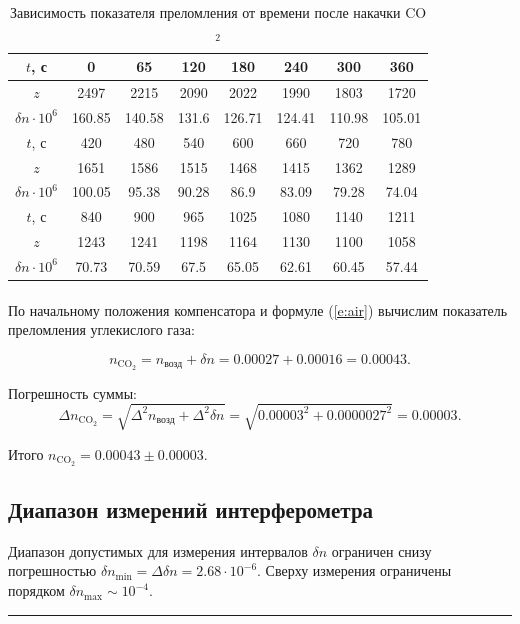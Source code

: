 \documentclass[a4paper,12pt]{article} %
\begin{document}
\begin{table}
\centering
\begin{tabular}{|c|c|c|c|c|c|c|c|}
\hline 
$t$, с & 0 & 65 & 120 & 180 & 240 & 300 & 360\\
\hline
$z$ & 2497 & 2215 & 2090 & 2022 & 1990 & 1803 & 1720\\
\hline
$\delta n \cdot 10^6$ & 160.85 & 140.58 & 131.6 & 126.71 & 124.41 & 110.98 & 105.01\\
\hline
$t$, с & 420 & 480 & 540 & 600 & 660 & 720 & 780\\
\hline
$z$ & 1651 & 1586 & 1515 & 1468 & 1415 & 1362 & 1289\\
\hline
$\delta n \cdot 10^6$ & 100.05 & 95.38 & 90.28 & 86.9 & 83.09 & 79.28 & 74.04\\
\hline
$t$, с & 840 & 900 & 965 & 1025 & 1080 & 1140 & 1211\\
\hline
$z$ & 1243 & 1241 & 1198 & 1164 & 1130 & 1100 & 1058\\
\hline
$\delta n \cdot 10^6$ & 70.73 & 70.59 & 67.5 & 65.05 & 62.61 & 60.45 & 57.44\\
\hline
\end{tabular} 
\caption{Зависимость показателя преломления от времени после накачки CO$_2$}
\label{t:gas}
\end{table} 

\paragraph{} По начальному положения компенсатора и формуле (\ref{e:air}) вычислим показатель преломления углекислого газа:

\[
n_{\text{CO}_2} = n_\text{возд} + \delta n = 0.00027 + 0.00016 = 0.00043.
\]

\noindent Погрешность суммы:
\[
\Delta n_{\text{CO}_2} = \sqrt{\Delta ^2 n_\text{возд} + \Delta^2 \delta n} = \sqrt{0.00003^2 + 0.0000027^2} = 0.00003.
\]


\noindent Итого $n_{\text{CO}_2} = 0.00043 \pm 0.00003$.

\subsection{Диапазон измерений интерферометра}
Диапазон допустимых для измерения интервалов $\delta n$ ограничен снизу погрешностью $\delta n_
{\min} = \Delta \delta n = 2.68 \cdot 10^{-6}$. Сверху измерения ограничены порядком $\delta n_{\max} \sim 10^{-4}$.


\medskip\hrule\medskip
\FloatBarrier
\end{document}

